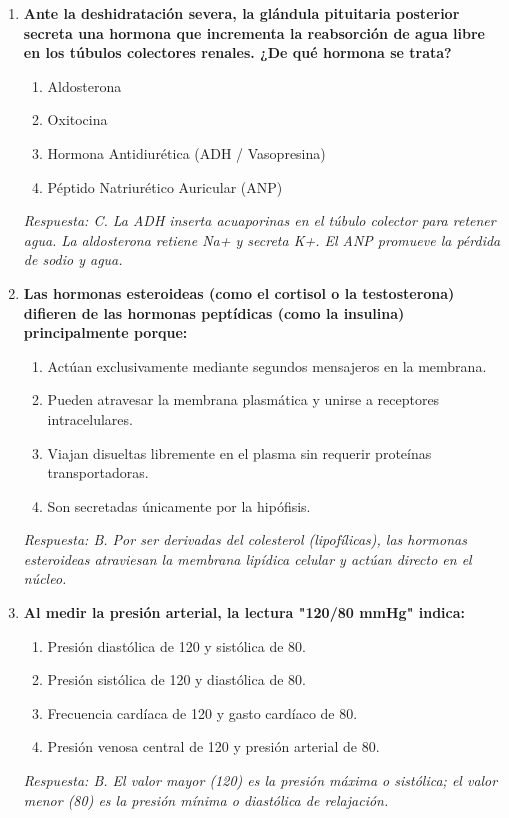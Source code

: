 \documentclass[spanish,letterpaper,oneside]{article}
\begin{document}
\begin{enumerate}[label=\textbf{\arabic*.}]
    \item \textbf{Ante la deshidratación severa, la glándula pituitaria posterior secreta una hormona que incrementa la reabsorción de agua libre en los túbulos colectores renales. ¿De qué hormona se trata?}
    \begin{enumerate}
        \item[A)] Aldosterona
        \item[B)] Oxitocina
        \item[C)] Hormona Antidiurética (ADH / Vasopresina)
        \item[D)] Péptido Natriurético Auricular (ANP)
    \end{enumerate}
    \textit{Respuesta: C. La ADH inserta acuaporinas en el túbulo colector para retener agua. La aldosterona retiene Na+ y secreta K+. El ANP promueve la pérdida de sodio y agua.}

    \item \textbf{Las hormonas esteroideas (como el cortisol o la testosterona) difieren de las hormonas peptídicas (como la insulina) principalmente porque:}
    \begin{enumerate}
        \item[A)] Actúan exclusivamente mediante segundos mensajeros en la membrana.
        \item[B)] Pueden atravesar la membrana plasmática y unirse a receptores intracelulares.
        \item[C)] Viajan disueltas libremente en el plasma sin requerir proteínas transportadoras.
        \item[D)] Son secretadas únicamente por la hipófisis.
    \end{enumerate}
    \textit{Respuesta: B. Por ser derivadas del colesterol (lipofílicas), las hormonas esteroideas atraviesan la membrana lipídica celular y actúan directo en el núcleo.}

    \item \textbf{Al medir la presión arterial, la lectura "120/80 mmHg" indica:}
    \begin{enumerate}
        \item[A)] Presión diastólica de 120 y sistólica de 80.
        \item[B)] Presión sistólica de 120 y diastólica de 80.
        \item[C)] Frecuencia cardíaca de 120 y gasto cardíaco de 80.
        \item[D)] Presión venosa central de 120 y presión arterial de 80.
    \end{enumerate}
    \textit{Respuesta: B. El valor mayor (120) es la presión máxima o sistólica; el valor menor (80) es la presión mínima o diastólica de relajación.}


\end{enumerate}
\end{document}
